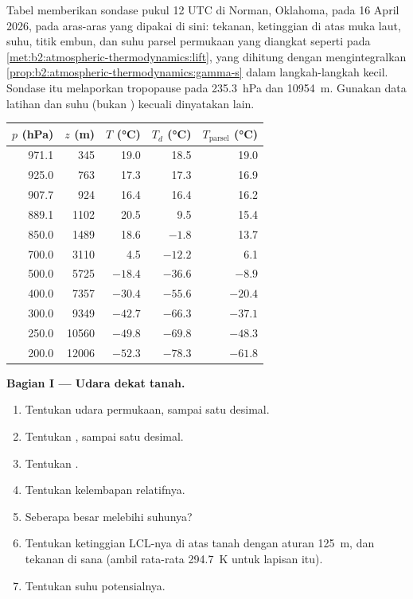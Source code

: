\begin{problem}\label{pb:b2:atmospheric-thermodynamics:1}
Tabel memberikan sondase pukul 12 UTC di Norman, Oklahoma, pada 16 April 2026, pada aras-aras yang dipakai
di sini: tekanan, ketinggian di atas muka laut, suhu, titik embun, dan suhu
parsel permukaan yang diangkat seperti pada \cref{met:b2:atmospheric-thermodynamics:lift}, yang dihitung dengan
mengintegralkan \cref{prop:b2:atmospheric-thermodynamics:gamma-s} dalam langkah-langkah kecil. Sondase itu
melaporkan tropopause pada \qty{235.3}{hPa} dan \qty{10954}{m}. Gunakan data latihan dan
suhu (bukan ) kecuali dinyatakan lain.

\begin{center}
\small
\begin{tabular}{rrrrr}
\hline
$p$ (\unit{hPa}) & $z$ (\unit{m}) & $T$ (\unit{\celsius}) & $T_d$ (\unit{\celsius}) &
$T_{\text{parsel}}$ (\unit{\celsius}) \\
\hline
971.1 & 345 & 19.0 & 18.5 & 19.0 \\
925.0 & 763 & 17.3 & 17.3 & 16.9 \\
907.7 & 924 & 16.4 & 16.4 & 16.2 \\
889.1 & 1102 & 20.5 & 9.5 & 15.4 \\
850.0 & 1489 & 18.6 & $-1.8$ & 13.7 \\
700.0 & 3110 & 4.5 & $-12.2$ & 6.1 \\
500.0 & 5725 & $-18.4$ & $-36.6$ & $-8.9$ \\
400.0 & 7357 & $-30.4$ & $-55.6$ & $-20.4$ \\
300.0 & 9349 & $-42.7$ & $-66.3$ & $-37.1$ \\
250.0 & 10560 & $-49.8$ & $-69.8$ & $-48.3$ \\
200.0 & 12006 & $-52.3$ & $-78.3$ & $-61.8$ \\
\hline
\end{tabular}
\end{center}

\medskip\noindent\textbf{Bagian I --- Udara dekat tanah.}
\begin{enumerate}
  \item Tentukan  udara permukaan, sampai satu desimal.
  \item Tentukan , sampai satu desimal.
  \item Tentukan .
  \item Tentukan kelembapan relatifnya.
  \item Seberapa besar  melebihi suhunya?
  \item Tentukan ketinggian LCL-nya di atas tanah dengan aturan \qty{125}{m}, dan tekanan
        di sana (ambil  rata-rata \qty{294.7}{K} untuk lapisan itu).
  \item Tentukan suhu potensialnya.
\end{enumerate}


\end{problem}
